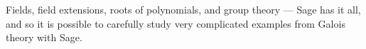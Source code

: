 Fields, field extensions, roots of polynomials, and group theory --- Sage has it all, and so it is possible to carefully study very complicated examples from Galois theory with Sage.
